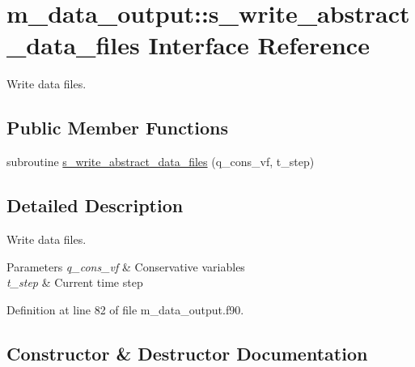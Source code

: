 \hypertarget{interfacem__data__output_1_1s__write__abstract__data__files}{}\section{m\+\_\+data\+\_\+output\+:\+:s\+\_\+write\+\_\+abstract\+\_\+data\+\_\+files Interface Reference}
\label{interfacem__data__output_1_1s__write__abstract__data__files}


Write data files.  


\subsection*{Public Member Functions}
\begin{DoxyCompactItemize}
\item 
subroutine \hyperlink{interfacem__data__output_1_1s__write__abstract__data__files_a8fac1f3a38f748b6cb921332855ce9c7}{s\+\_\+write\+\_\+abstract\+\_\+data\+\_\+files} (q\+\_\+cons\+\_\+vf, t\+\_\+step)
\end{DoxyCompactItemize}


\subsection{Detailed Description}
Write data files. 


\begin{DoxyParams}{Parameters}
{\em q\+\_\+cons\+\_\+vf} & Conservative variables \\
\hline
{\em t\+\_\+step} & Current time step \\
\hline
\end{DoxyParams}


Definition at line 82 of file m\+\_\+data\+\_\+output.\+f90.



\subsection{Constructor \& Destructor Documentation}
\mbox{\label{interfacem__data__output_1_1s__write__abstract__data__files_a8fac1f3a38f748b6cb921332855ce9c7}} 
